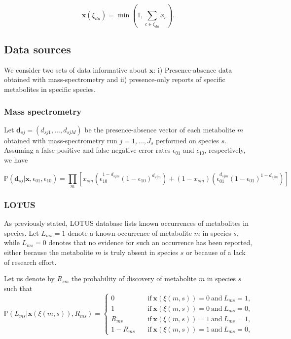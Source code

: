 \documentclass[
11pt, %
oneside, %
english, %
singlespacing, %
headsepline, %
chapterinoneline, %
]{MastersDoctoralThesis} %
\def\P{\mathbb{P}}
\def\x{\boldsymbol{x}}
\def\bd{\boldsymbol{d}}
\begin{document}
	\begin{equation}
		\x(\xi_{du}) = \min \left(1, \sum_{c \in \xi_{du}} x_c \right).
	\end{equation}

	\subsection{Data sources}\label{subsec: data sources}
	We consider two sets of data informative about $\x$: i) Presence-absence data obtained with mass-spectrometry and ii) presence-only reports of specific metabolites in specific species.
	
	\subsubsection{Mass spectrometry}
	 Let $\bd _{sj}=(d_{sj1}, \ldots, d_{sjM})$ be the presence-absence vector of each metabolite $m$ obtained with mass-spectrometry run $j=1,\ldots,J_s$ performed on species $s$. Assuming a false-positive and false-negative error rates $\epsilon_{01}$ and $\epsilon_{10}$, respectively, we have
	
	\begin{equation}\label{eq:mass spec error rate}
		\P(\bd_{sj}|\x, \epsilon_{01}, \epsilon_{10}) = \prod_m \left[ x_{sm}\left(\epsilon_{10}^{1-d_{sjm}}(1-\epsilon_{10})^{d_{sjm}}\right) + (1-x_{sm})\left( \epsilon_{01}^{d_{sjm}}(1-\epsilon_{01})^{1-d_{sjm}}\right)\right]
	\end{equation}
	\subsubsection{LOTUS}
	
	As previously stated, LOTUS database \cite{rutzLOTUSInitiativeOpen2022} lists known occurrences of metabolites in species. Let $L_{ms} = 1$ denote a known occurrence of metabolite $m$ in species $s$, while $L_{ms}=0$ denotes that no evidence for such an occurrence has been reported, either because the metabolite $m$ is truly absent in species $s$ or because of a lack of research effort.
	
	Let us denote by $R_{sm}$ the probability of discovery of metabolite $m$ in species $s$ such that
	\begin{equation}\label{eq:prob lotus given x and Rsm}
		\P(L_{ms}|\x(\xi(m,s)), R_{ms}) = 
		\begin{cases}
			0 \quad &\mathrm{if\ } \x(\xi(m,s))=0 \mathrm{\ and\ } L_{ms} = 1,\\
			1 \quad &\mathrm{if\ } \x(\xi(m,s))=0 \mathrm{\ and\ } L_{ms} = 0,\\
			R_{ms} \quad &\mathrm{if\ } \x(\xi(m,s))=1 \mathrm{\ and\ } L_{ms} = 1,\\
			1- R_{ms} \quad &\mathrm{if\ } \x(\xi(m,s))=1 \mathrm{\ and\ } L_{ms} = 0,
		\end{cases}
	\end{equation}
	
\end{document}
